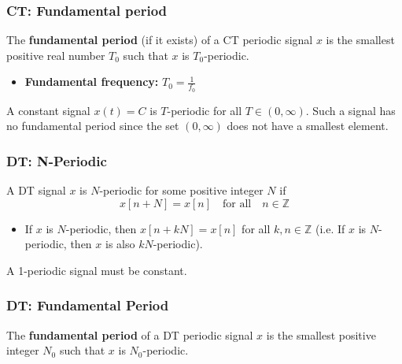     \subsubsection{CT: Fundamental period}
    \begin{definition}
        The \textbf{fundamental period} (if it exists) of a CT periodic signal \(x\) is the smallest positive real number \(T_0\) such that \(x\) is \(T_0\)-periodic.
        \begin{itemize}
            \item \textbf{Fundamental frequency:} $T_0 = \frac{1}{f_0}$
        \end{itemize}
    \end{definition}

    \begin{warning}
        A constant signal \(x(t) = C\) is \(T\)-periodic for all \(T \in (0, \infty)\). Such a signal has no fundamental period since the set \((0, \infty)\) does not have a smallest element.
    \end{warning}

    \subsubsection{DT: N-Periodic}
    \begin{definition}
        A DT signal \(x\) is \(N\)-periodic for some positive integer \(N\) if
        \begin{equation}
            x[n + N] = x[n] \quad \text{for all} \quad n \in \mathbb{Z}    
        \end{equation}
            
        \begin{itemize}
            \item If \(x\) is \(N\)-periodic, then \(x[n + kN] = x[n]\) for all \(k, n \in \mathbb{Z}\) (i.e. If \(x\) is \(N\)-periodic, then \(x\) is also \(kN\)-periodic).
        \end{itemize}
    \end{definition}
    
    \begin{warning}
        A 1-periodic signal must be constant.
    \end{warning}

    \subsubsection{DT: Fundamental Period}
    \begin{definition}
        The \textbf{fundamental period} of a DT periodic signal \(x\) is the smallest positive integer \(N_0\) such that \(x\) is \(N_0\)-periodic.
    \end{definition}

